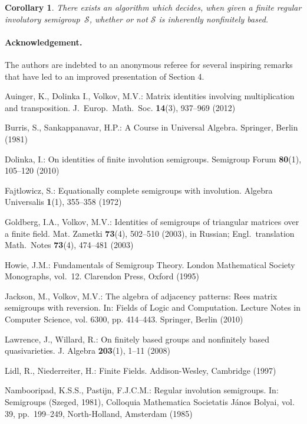 \documentclass[11pt,reqno]{amsart}
\newcommand{\is}{involutory semi\-group}
\newcommand{\infb}{inherently non\-finitely based}
\newtheorem{Cor}[Thm]{Corollary}
\begin{document}
\begin{Cor}
There exists an algorithm which decides, when given a finite regular \is\ $\mathcal{S}$, whether or not $\mathcal{S}$ is \infb.
\end{Cor}

\paragraph*{\textbf{Acknowledgement}.} The authors are indebted to an anonymous referee for several inspiring remarks that have led to an improved
presentation of Section 4.

\begin{thebibliography}{99}
Auinger, K., Dolinka I., Volkov, M.V.: Matrix identities involving multiplication and transposition. J.~Europ.\ Math.\ Soc. \textbf{14}(3),
937--969 (2012)

Burris, S., Sankappanavar, H.P.: A Course in Universal Algebra. Springer, Berlin (1981)

Dolinka, I.: On identities of finite involution semigroups. Semigroup Forum \textbf{80}(1), 105--120 (2010)

Fajtlowicz, S.: Equationally complete semigroups with involution. Algebra Universalis \textbf{1}(1), 355--358 (1972)

Goldberg, I.A., Volkov, M.V.: Identities of semigroups of triangular matrices over a finite field. Mat. Zametki \textbf{73}(4), 502--510
(2003), in Russian; Engl.\ translation Math.\ Notes \textbf{73}(4), 474--481 (2003)

Howie, J.M.: Fundamentals of Semigroup Theory. London Mathematical Society Monographs, vol.~12. Clarendon Press, Oxford (1995)

Jackson, M., Volkov, M.V.: The algebra of adjacency patterns: Rees matrix semigroups with reversion. In: Fields of Logic and Computation.
Lecture Notes in Computer Science, vol. 6300, pp. 414--443. Springer, Berlin (2010)

Lawrence, J., Willard, R.: On finitely based groups and nonfinitely based quasivarieties. J. Algebra \textbf{203}(1), 1--11 (2008)

Lidl, R., Niederreiter, H.: Finite Fields. Addison-Wesley, Cambridge (1997)

Nambooripad, K.S.S., Pastijn, F.J.C.M.: Regular involution semigroups. In: Semigroups (Szeged, 1981),
Colloquia Mathematica Societatis J\'anos Bolyai, vol. 39, pp.~199--249, North-Holland, Amsterdam (1985)


\end{thebibliography}
\end{document}
